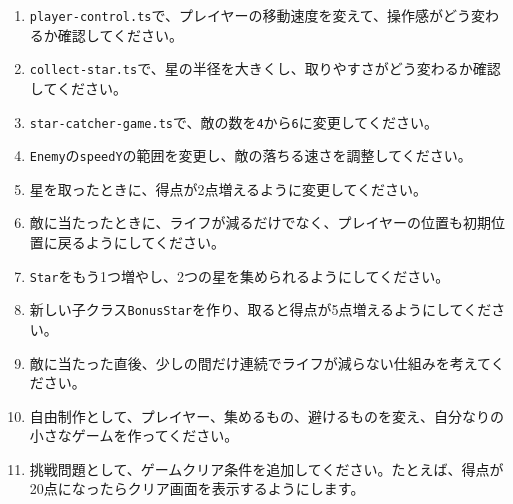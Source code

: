 \begin{enumerate}
    \item \texttt{player-control.ts}で、プレイヤーの移動速度を変えて、操作感がどう変わるか確認してください。
    \item \texttt{collect-star.ts}で、星の半径を大きくし、取りやすさがどう変わるか確認してください。
    \item \texttt{star-catcher-game.ts}で、敵の数を\texttt{4}から\texttt{6}に変更してください。
    \item \texttt{Enemy}の\texttt{speedY}の範囲を変更し、敵の落ちる速さを調整してください。
    \item 星を取ったときに、得点が2点増えるように変更してください。
    \item 敵に当たったときに、ライフが減るだけでなく、プレイヤーの位置も初期位置に戻るようにしてください。
    \item \texttt{Star}をもう1つ増やし、2つの星を集められるようにしてください。
    \item 新しい子クラス\texttt{BonusStar}を作り、取ると得点が5点増えるようにしてください。
    \item 敵に当たった直後、少しの間だけ連続でライフが減らない仕組みを考えてください。
    \item 自由制作として、プレイヤー、集めるもの、避けるものを変え、自分なりの小さなゲームを作ってください。
    \item 挑戦問題として、ゲームクリア条件を追加してください。たとえば、得点が20点になったらクリア画面を表示するようにします。
\end{enumerate}
